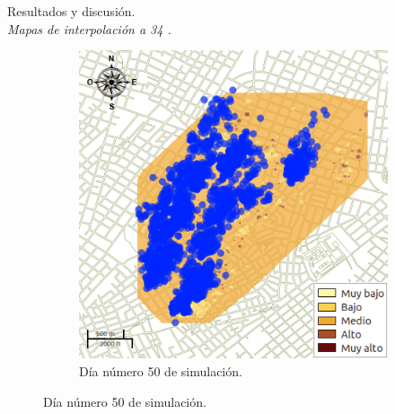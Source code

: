 \begin{frame}[t]{Resultados y discusión.\\\textit{Mapas de interpolación a 34 \textcelsius.}}
\begin{figure}
\begin{subfigure}[b]{0.45\textwidth}
        \includegraphics[width=\textwidth]{../book/capitulo-6/graphics/raster/temp-34-42.png}
        \caption{Día número 50 de simulación.}
    \end{subfigure}
    \end{figure}
\end{frame}
